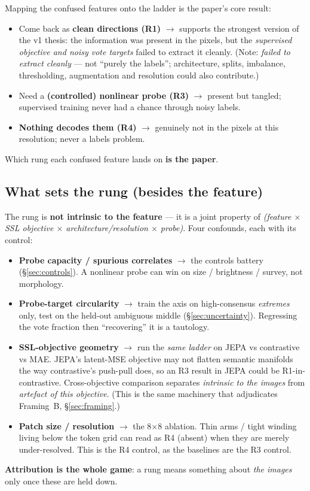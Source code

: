 \documentclass[11pt,a4paper]{article}
\begin{document}
Mapping the confused features onto the ladder is the paper's core result:
\begin{itemize}[leftmargin=1.4em,itemsep=2pt]
\item Come back as \textbf{clean directions (R1)} $\rightarrow$ supports the strongest version of
the v1 thesis: the information was present in the pixels, but the \emph{supervised objective and
noisy vote targets} failed to extract it cleanly. (Note: \emph{failed to extract cleanly} ---
not ``purely the labels''; architecture, splits, imbalance, thresholding, augmentation and
resolution could also contribute.)
\item Need a \textbf{(controlled) nonlinear probe (R3)} $\rightarrow$ present but tangled;
supervised training never had a chance through noisy labels.
\item \textbf{Nothing decodes them (R4)} $\rightarrow$ genuinely not in the pixels at this
resolution; never a labels problem.
\end{itemize}
Which rung each confused feature lands on \textbf{is the paper}.

\subsection{What sets the rung (besides the feature)}

The rung is \textbf{not intrinsic to the feature} --- it is a joint property of
\emph{(feature $\times$ SSL objective $\times$ architecture/resolution $\times$ probe)}. Four
confounds, each with its control:
\begin{itemize}[leftmargin=1.4em,itemsep=2pt]
\item \textbf{Probe capacity / spurious correlates} $\rightarrow$ the controls battery
(\S\ref{sec:controls}). A nonlinear probe can win on size / brightness / survey, not morphology.
\item \textbf{Probe-target circularity} $\rightarrow$ train the axis on high-consensus
\emph{extremes} only, test on the held-out ambiguous middle (\S\ref{sec:uncertainty}). Regressing
the vote fraction then ``recovering'' it is a tautology.
\item \textbf{SSL-objective geometry} $\rightarrow$ run the \emph{same ladder} on JEPA vs
contrastive vs MAE. JEPA's latent-MSE objective may not flatten semantic manifolds the way
contrastive's push-pull does, so an R3 result in JEPA could be R1-in-contrastive. Cross-objective
comparison separates \emph{intrinsic to the images} from \emph{artefact of this objective}. (This
is the same machinery that adjudicates Framing~B, \S\ref{sec:framing}.)
\item \textbf{Patch size / resolution} $\rightarrow$ the 8$\times$8 ablation. Thin arms / tight
winding living below the token grid can read as R4 (absent) when they are merely under-resolved.
This is the R4 control, as the baselines are the R3 control.
\end{itemize}
\textbf{Attribution is the whole game}: a rung means something about \emph{the images} only once
these are held down.
\end{document}
